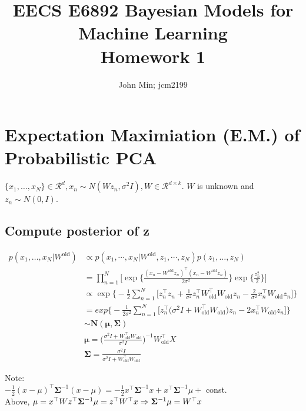 \documentclass{article}
\title{EECS E6892 Bayesian Models for Machine Learning\\ Homework 1}
\author{John Min; jcm2199}
\begin{document}
\maketitle

\section{Expectation Maximiation (E.M.) of Probabilistic PCA}
$\{x_1, \ldots, x_N\} \in \mathcal{R}^d, x_n \sim N(W z_n, \sigma^2 I), W \in \mathcal{R}^{d \times k}$.  $W$ is unknown and $z_n \sim N(0, I)$.

\subsection{Compute posterior of z}
\begin{align*}
\displaystyle p(x_1, \ldots, x_N | W^{\text{old}}) & \propto p(x_1, \cdots, x_N | W^{\text{old}}, z_1, \cdots, z_N) p(z_1, \ldots, z_N) \\
& = \prod_{n=1}^N \Bigg[\exp \bigg\{\frac{(x_n - W^{\text{old}} z_n)^\top (x_n - W^{\text{old}} z_n) }{2 \sigma^2}\bigg\} \exp \bigg\{\frac{z_n^2}{2}\bigg\}\Bigg] \\
& \propto \exp \Bigg\{-\frac{1}{2} \sum_{n=1}^N \bigg[ z_n^\top z_n + \frac{1}{\sigma^2} z_n^\top W_{\text{old}}^\top W_{\text{old}} z_n - \frac{2}{\sigma^2} x_n^\top W_{\text{old}} z_n \bigg] \Bigg\}  \\
& = exp \Bigg\{-\frac{1}{2 \sigma^2} \sum_{n=1}^N \bigg[ z_n^\top \Big(\sigma^2 I + W_{\text{old}}^\top W_{\text{old}}) z_n - 2 x_n^\top W_{\text{old}} z_n \bigg] \Bigg\} \\
& \sim \mathbf{N(\mu, \Sigma)} \\
&\mathbf{\mu} = \bigg(\frac{\sigma^2 I + W_{\text{old}}^\top W_{\text{old}}}{\sigma^2 I} \bigg)^{-1} W_{\text{old}}^\top X \\
&\mathbf{\Sigma} = \frac{\sigma^2 I}{\sigma^2 I + W_{\text{old}}^\top W_{\text{old}}}
\end{align*}

\noindent
Note: \\
$- \frac{1}{2} (x - \mu)^\top \mathbf{\Sigma}^{-1} (x-\mu) = -\frac{1}{2} x^\top \mathbf{\Sigma}^{-1} x + x^\top \mathbf{\Sigma}^{-1} \mu +$ const. \\

\noindent
Above,
$\mu = x^\top W \\
z^\top \mathbf{\Sigma}^{-1} \mu = z^\top W^\top x \Rightarrow \mathbf{\Sigma}^{-1} \mu = W^\top x$
\end{document}
